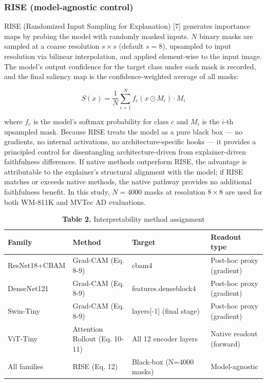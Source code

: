 \documentclass[11pt,a4paper]{article}
\begin{document}
\subsubsection{RISE (model-agnostic control)}

RISE (Randomized Input Sampling for Explanation) [7] generates importance maps by probing the model with randomly masked inputs. $N$ binary masks are sampled at a coarse resolution $s{\times}s$ (default $s{=}8$), upsampled to input resolution via bilinear interpolation, and applied element-wise to the input image. The model's output confidence for the target class under each mask is recorded, and the final saliency map is the confidence-weighted average of all masks:

\begin{equation}
S(x) = \frac{1}{N} \sum_{i=1}^{N} f_c(x \odot M_i) \cdot M_i
\tag{12}
\end{equation}

where $f_c$ is the model's softmax probability for class $c$ and $M_i$ is the $i$-th upsampled mask. Because RISE treats the model as a pure black box --- no gradients, no internal activations, no architecture-specific hooks --- it provides a principled control for disentangling architecture-driven from explainer-driven faithfulness differences. If native methods outperform RISE, the advantage is attributable to the explainer's structural alignment with the model; if RISE matches or exceeds native methods, the native pathway provides no additional faithfulness benefit. In this study, $N{=}4000$ masks at resolution $8{\times}8$ are used for both WM-811K and MVTec AD evaluations.

\begin{table}[htbp]
\centering
\small
\caption{\textbf{Table 2.} Interpretability method assignment}
\begin{tabular}{llll}
\toprule
Family & Method & Target & Readout type \\
\midrule
ResNet18+CBAM & Grad-CAM (Eq. 8-9) & cbam4 & Post-hoc proxy (gradient) \\
DenseNet121 & Grad-CAM (Eq. 8-9) & features.denseblock4 & Post-hoc proxy (gradient) \\
Swin-Tiny & Grad-CAM (Eq. 8-9) & layers[-1] (final stage) & Post-hoc proxy (gradient) \\
ViT-Tiny & Attention Rollout (Eq. 10-11) & All 12 encoder layers & Native readout (forward) \\
All families & RISE (Eq. 12) & Black-box (N=4000 masks) & Model-agnostic \\
\bottomrule
\end{tabular}
\end{table}
\end{document}
